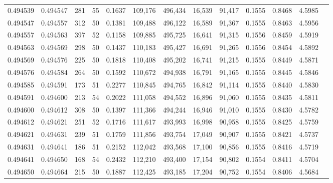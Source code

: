 \begin{tabular}{rrrrrrrrrrrrr}
0.494539 & 0.494547 & 281 &  55 &                                     0.1637 & 109,176 & 496,434 &  16,539 &  91,417 & 0.1555 & 0.8468 & 4.5985 \\
0.494547 & 0.494557 & 312 &  50 &                                     0.1381 & 109,488 & 496,122 &  16,589 &  91,367 & 0.1555 & 0.8463 & 4.5956 \\
0.494557 & 0.494563 & 397 &  52 &                                     0.1158 & 109,885 & 495,725 &  16,641 &  91,315 & 0.1556 & 0.8459 & 4.5919 \\
0.494563 & 0.494569 & 298 &  50 &                                     0.1437 & 110,183 & 495,427 &  16,691 &  91,265 & 0.1556 & 0.8454 & 4.5892 \\
0.494569 & 0.494576 & 225 &  50 &                                     0.1818 & 110,408 & 495,202 &  16,741 &  91,215 & 0.1555 & 0.8449 & 4.5871 \\
0.494576 & 0.494584 & 264 &  50 &                                     0.1592 & 110,672 & 494,938 &  16,791 &  91,165 & 0.1555 & 0.8445 & 4.5846 \\
0.494585 & 0.494591 & 173 &  51 &                                     0.2277 & 110,845 & 494,765 &  16,842 &  91,114 & 0.1555 & 0.8440 & 4.5830 \\
0.494591 & 0.494600 & 213 &  54 &                                     0.2022 & 111,058 & 494,552 &  16,896 &  91,060 & 0.1555 & 0.8435 & 4.5811 \\
0.494600 & 0.494612 & 308 &  50 &                                     0.1397 & 111,366 & 494,244 &  16,946 &  91,010 & 0.1555 & 0.8430 & 4.5782 \\
0.494612 & 0.494621 & 251 &  52 &                                     0.1716 & 111,617 & 493,993 &  16,998 &  90,958 & 0.1555 & 0.8425 & 4.5759 \\
0.494621 & 0.494631 & 239 &  51 &                                     0.1759 & 111,856 & 493,754 &  17,049 &  90,907 & 0.1555 & 0.8421 & 4.5737 \\
0.494631 & 0.494641 & 186 &  51 &                                     0.2152 & 112,042 & 493,568 &  17,100 &  90,856 & 0.1555 & 0.8416 & 4.5719 \\
0.494641 & 0.494650 & 168 &  54 &                                     0.2432 & 112,210 & 493,400 &  17,154 &  90,802 & 0.1554 & 0.8411 & 4.5704 \\
0.494650 & 0.494664 & 215 &  50 &                                     0.1887 & 112,425 & 493,185 &  17,204 &  90,752 & 0.1554 & 0.8406 & 4.5684 \\

\end{tabular}
